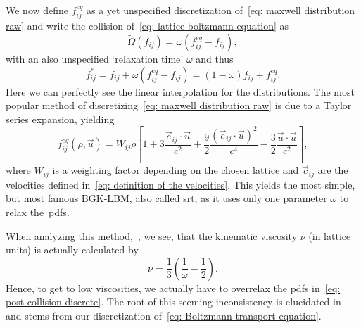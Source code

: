 We now define $f_{ij}^{eq}$ as a yet unspecified discretization of~\eqref{eq: maxwell distribution raw} and write the collision of~\eqref{eq: lattice boltzmann equation} as
\begin{equation}
  \tilde{\Omega}(f_{ij}) = \omega \left(f_{ij}^{eq} - f_{ij}\right),
\end{equation}
with an also unspecified `relaxation time' $\omega$ and thus
\begin{equation}
  \label{eq: post collision discrete}
  f_{ij}^* = f_{ij} + \omega \left(f_{ij}^{eq} - f_{ij}\right) = (1-\omega)f_{ij} + f_{ij}^{eq}.
\end{equation}
Here we can perfectly see the linear interpolation for the distributions.
The most popular method of discretizing~\eqref{eq: maxwell distribution raw} is due to a Taylor series expansion, yielding
\begin{equation}
  \label{eq: equilibrium particle distributions}
  f_{ij}^{eq}(\rho,\vec{u}) = W_{ij}\rho
  \left[
    1
    + 3\frac{\vec{c}_{ij} \cdot \vec{u}}{c^2}
    + \frac{9}{2}\frac{{(\vec{c}_{ij} \cdot \vec{u})}^2}{c^4}
    - \frac{3}{2}\frac{\vec{u} \cdot \vec{u}}{c^2}
  \right],
\end{equation}
where $W_{ij}$ is a weighting factor depending on the chosen lattice and $\vec{c}_{ij}$ are the velocities defined in~\eqref{eq: definition of the velocities}.
This yields the most simple, but most famous BGK-LBM, also called \gls{srt}, as it uses only one parameter $\omega$ to relax the~\glspl{pdf}.

When analyzing this method,~\cite[Section 5.2.3]{wolf2000lattice}, we see, that the kinematic viscosity $\nu$ (in lattice units) is actually calculated by
\begin{equation}
  \nu = \frac{1}{3}\left(\frac{1}{\omega} - \frac{1}{2}\right).
\end{equation}
Hence, to get to low viscosities, we actually have to overrelax the \glspl{pdf} in~\eqref{eq: post collision discrete}.
The root of this seeming inconsistency is elucidated in~\cite[Section 4]{karlin2006elements} and stems from our discretization of~\eqref{eq: Boltzmann transport equation}.

